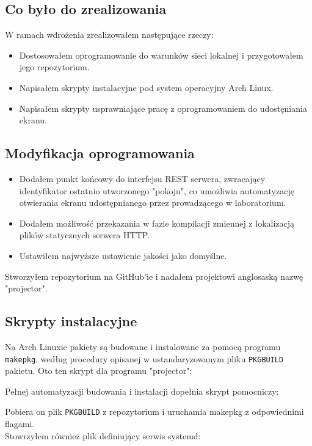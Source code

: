 \documentclass[a4paper,11pt]{article}
\begin{document}
        \subsection{Co było do zrealizowania}
        W ramach wdrożenia zrealizowałem następujące rzeczy: 
        \begin{itemize}
            \item Dostosowałem oprogramowanie do warunków sieci lokalnej i przygotowałem jego repozytorium.
            \item Napisałem skrypty instalacyjne pod system operacyjny Arch Linux.
            \item Napisałem skrypty usprawniające pracę z oprogramowaniem do udostęniania ekranu.
        \end{itemize}
        \subsection{Modyfikacja oprogramowania}
        \begin{itemize}
            \item Dodałem punkt końcowy do interfejsu REST serwera, zwracający identyfikator ostatnio utworzonego "pokoju", co umożliwia automatyzację otwierania ekranu udostępnianego przez prowadzącego w laboratorium.  
            \item Dodałem możliwość przekazania w fazie kompilacji zmiennej z lokalizacją plików statycznych serwera HTTP.
            \item Ustawiłem najwyższe ustawienie jakości jako domyślne. 
        \end{itemize}
        Stworzyłem repozytorium na GitHub'ie i nadałem projektowi anglosaską nazwę "projector".
        \subsection{Skrypty instalacyjne}
        Na Arch Linuxie pakiety są budowane i instalowane za pomocą programu \texttt{makepkg}, według procedury opisanej w ustandaryzowanym pliku \texttt{PKGBUILD} pakietu. 
        Oto ten skrypt dla programu "projector":
        
        Pełnej automatyzacji budowania i instalacji dopełnia skrypt pomocniczy:
        
        Pobiera on plik \texttt{PKGBUILD} z repozytorium i uruchamia makepkg z odpowiednimi flagami. 
        \\ Stowrzyłem również plik definiujący serwis systemd:
        
\end{document}
